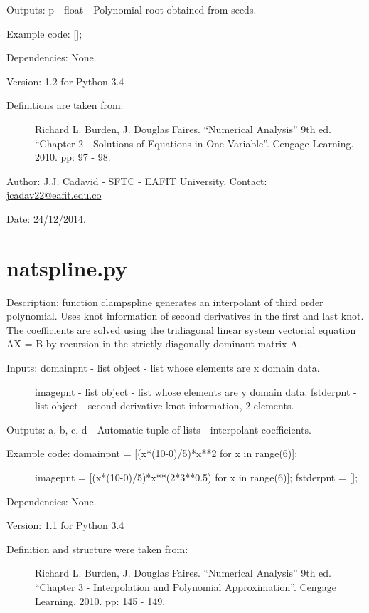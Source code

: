 \documentclass[letterpaper,10pt,oneside]{sphinxmanual}
\theoremstyle{plain}%
\theoremstyle{definition}%
\theoremstyle{remark}%
\begin{document}
Outputs: p - float - Polynomial root obtained from seeds.

Example code: {[}{]};

Dependencies: None.

Version: 1.2 for Python 3.4
\begin{description}
\item[{Definitions are taken from:}] \leavevmode
Richard L. Burden, J. Douglas Faires. ``Numerical Analysis'' 9th ed.
``Chapter 2 - Solutions of Equations in One Variable''. 
Cengage Learning. 2010. pp: 97 - 98.

\end{description}

Author: J.J. Cadavid - SFTC - EAFIT University.
Contact: \href{mailto:jcadav22@eafit.edu.co}{jcadav22@eafit.edu.co}

Date: 24/12/2014.


\section{natspline.py}
\label{code:module-natspline}\label{code:natspline-py}
Description: function clampspline generates an interpolant of third order 
polynomial. Uses knot information of second derivatives in the first and last
knot. The coefficients are solved using the tridiagonal linear system 
vectorial equation AX = B by recursion in the strictly diagonally dominant 
matrix A.
\begin{description}
\item[{Inputs: domainpnt - list object - list whose elements are x domain data.}] \leavevmode
imagepnt - list object - list whose elements are y domain data.
fstderpnt - list object - second derivative knot information, 2 elements.

\end{description}

Outputs: a, b, c, d - Automatic tuple of lists - interpolant coefficients.
\begin{description}
\item[{Example code: domainpnt = {[}(x*(10-0)/5)*x**2 for x in range(6){]};}] \leavevmode
imagepnt = {[}(x*(10-0)/5)*x**(2*3**0.5) for x in range(6){]};
fstderpnt = {[}{]};

\end{description}

Dependencies: None.

Version: 1.1 for Python 3.4
\begin{description}
\item[{Definition and structure were taken from:}] \leavevmode
Richard L. Burden, J. Douglas Faires. ``Numerical Analysis'' 9th ed.
``Chapter 3 - Interpolation and Polynomial Approximation''. 
Cengage Learning. 2010. pp: 145 - 149.

\end{description}
\end{document}
